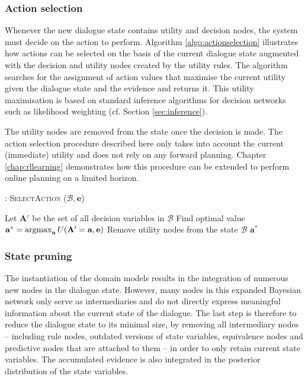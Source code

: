 \subsubsection*{Action selection}

Whenever the new dialogue state contains utility and decision nodes, the system must decide on the action to perform.  Algorithm \ref{algo:actionselection} illustrates how actions can be selected on the basis of the current dialogue state augmented with the decision and utility nodes created by the utility rules. The algorithm searches for the assignment of action values that maximise the current utility given the dialogue state and the evidence and returns it. This utility maximisation is based on standard inference algorithms for decision networks such as likelihood weighting (cf. Section \ref{sec:inference}). 

The utility nodes are removed from the state once the decision is made. The action selection procedure described here only takes into account the current (immediate) utility and does not rely on any forward planning.  Chapter \ref{chap:rllearning} demonstrates how this procedure can be extended to perform online planning on a limited horizon.  \\

\begin{algorithm}[h]
\caption{: \textsc{SelectAction} ($\mathcal{B}, \mathbf{e}$)}
\begin{algorithmic}[1] \vspace{1mm}
\STATE Let $\mathbf{A}'$ be the set of all decision variables in $\mathcal{B}$
\STATE Find optimal value $\mathbf{a}^* = \argmax_{\mathbf{a}} U(\mathbf{A}' = \mathbf{a}, \mathbf{e})$
\STATE Remove utility nodes from the state $\mathcal{B}$
\RETURN $\mathbf{a}^*$
\end{algorithmic}
\label{algo:actionselection}
\end{algorithm}


\subsubsection*{State pruning}

The instantiation of the domain models results in the integration of numerous new nodes in the dialogue state. However, many nodes in this expanded Bayesian network  only serve as intermediaries and do not directly express meaningful information about the current state of the dialogue. The last step is therefore to reduce the dialogue state to its minimal size, by removing all intermediary nodes -- including rule nodes, outdated versions of state variables, equivalence nodes and predictive nodes that are attached to them -- in order to only retain current state variables. The accumulated evidence is also integrated in the posterior distribution of the state variables.

